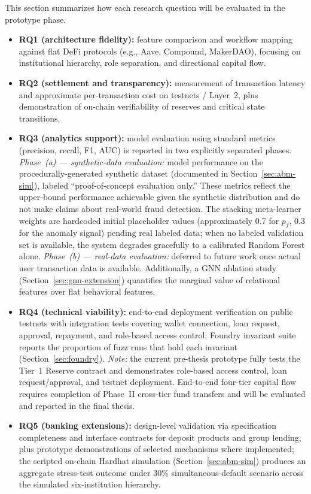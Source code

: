 \documentclass[12pt,a4paper]{report}
\begin{document}
This section summarizes how each research question will be evaluated in the prototype phase.
\begin{itemize}[noitemsep]
\item \textbf{RQ1 (architecture fidelity):} feature comparison and workflow mapping against flat DeFi protocols (e.g., Aave, Compound, MakerDAO), focusing on institutional hierarchy, role separation, and directional capital flow.
\item \textbf{RQ2 (settlement and transparency):} measurement of transaction latency and approximate per-transaction cost on testnets / Layer~2, plus demonstration of on-chain verifiability of reserves and critical state transitions.
\item \textbf{RQ3 (analytics support):} model evaluation using standard metrics (precision, recall, F1, AUC) is reported in two explicitly separated phases. \textit{Phase~(a) --- synthetic-data evaluation:} model performance on the procedurally-generated synthetic dataset (documented in Section~\ref{sec:abm-sim}), labeled ``proof-of-concept evaluation only.'' These metrics reflect the upper-bound performance achievable given the synthetic distribution and do not make claims about real-world fraud detection. The stacking meta-learner weights are hardcoded initial placeholder values (approximately 0.7 for $p_f$, 0.3 for the anomaly signal) pending real labeled data; when no labeled validation set is available, the system degrades gracefully to a calibrated Random Forest alone. \textit{Phase~(b) --- real-data evaluation:} deferred to future work once actual user transaction data is available. Additionally, a GNN ablation study (Section~\ref{sec:gnn-extension}) quantifies the marginal value of relational features over flat behavioral features.
\item \textbf{RQ4 (technical viability):} end-to-end deployment verification on public testnets with integration tests covering wallet connection, loan request, approval, repayment, and role-based access control; Foundry invariant suite reports the proportion of fuzz runs that hold each invariant (Section~\ref{sec:foundry}). \textit{Note:} the current pre-thesis prototype fully tests the Tier~1 Reserve contract and demonstrates role-based access control, loan request/approval, and testnet deployment. End-to-end four-tier capital flow requires completion of Phase~II cross-tier fund transfers and will be evaluated and reported in the final thesis.
\item \textbf{RQ5 (banking extensions):} design-level validation via specification completeness and interface contracts for deposit products and group lending, plus prototype demonstrations of selected mechanisms where implemented; the scripted on-chain Hardhat simulation (Section~\ref{sec:abm-sim}) produces an aggregate stress-test outcome under 30\% simultaneous-default scenario across the simulated six-institution hierarchy.
\end{itemize}
\end{document}
